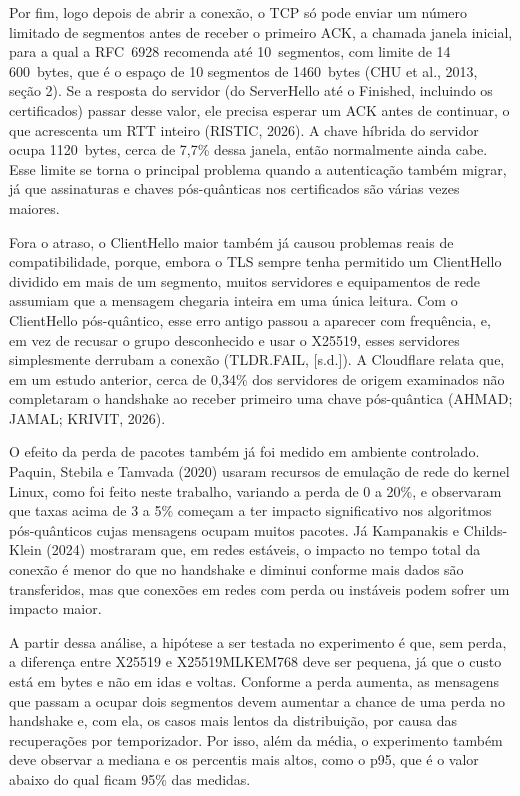 \documentclass[12pt,a4paper]{article}
\begin{document}
Por fim, logo depois de abrir a conexão, o TCP só pode enviar um número
limitado de segmentos antes de receber o primeiro ACK, a chamada janela
inicial, para a qual a RFC~6928 recomenda até 10~segmentos, com limite de
14\,600~bytes, que é o espaço de 10 segmentos de 1460~bytes (CHU et al.,
2013, seção 2). Se a resposta do
servidor (do ServerHello até o Finished, incluindo os
certificados) passar desse valor, ele precisa esperar um ACK antes de
continuar, o que acrescenta um RTT inteiro (RISTIC, 2026). A chave
híbrida do servidor ocupa 1120~bytes, cerca de 7,7\% dessa janela, então
normalmente ainda cabe. Esse limite se torna o principal problema quando a
autenticação também migrar, já que assinaturas e chaves pós-quânticas nos
certificados são várias vezes maiores.

Fora o atraso, o ClientHello maior também já causou problemas reais de
compatibilidade, porque, embora o TLS sempre tenha permitido um ClientHello
dividido em mais de um segmento, muitos servidores e equipamentos de rede
assumiam que a mensagem chegaria inteira em uma única leitura. Com o
ClientHello pós-quântico, esse erro antigo passou a aparecer com frequência, e, em vez de recusar o grupo desconhecido e usar o X25519, esses
servidores simplesmente derrubam a conexão (TLDR.FAIL, [s.d.]). A
Cloudflare relata que, em um estudo anterior, cerca de 0,34\% dos
servidores de origem examinados não completaram o handshake ao receber
primeiro uma chave pós-quântica (AHMAD; JAMAL; KRIVIT, 2026).

O efeito da perda de pacotes também já foi medido em ambiente controlado.
Paquin, Stebila e Tamvada (2020) usaram recursos de emulação de rede do
kernel Linux, como foi feito neste trabalho, variando a perda de 0 a
20\%, e observaram que taxas acima de 3 a 5\% começam a ter impacto
significativo nos algoritmos pós-quânticos cujas mensagens ocupam muitos
pacotes. Já Kampanakis e Childs-Klein (2024) mostraram que, em redes
estáveis, o impacto no tempo total da conexão é menor do que no handshake e
diminui conforme mais dados são transferidos, mas que conexões em redes
com perda ou instáveis podem sofrer um impacto maior.



A partir dessa análise, a hipótese a ser testada no experimento é que,
sem perda, a diferença entre X25519 e X25519MLKEM768 deve ser
pequena, já que o custo está em bytes e não em idas e voltas. Conforme a
perda aumenta, as mensagens que passam a ocupar dois segmentos devem
aumentar a chance de uma perda no handshake e, com ela, os casos mais lentos da
distribuição, por causa das recuperações por temporizador. Por isso, além
da média, o experimento também deve observar a mediana e os percentis mais
altos, como o p95, que é o valor abaixo do qual ficam 95\% das medidas.
\end{document}
